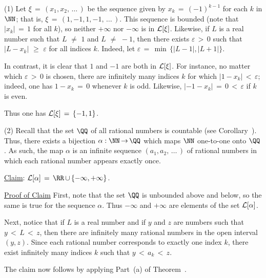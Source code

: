 {        \hspace*{\parindent}(1) Let ${\xi} \,=\, (x_{1},x_{2},\,{\ldots}\,)$ be the sequence given by $x_{k} \,=\, (-1)^{k-1}$ for each $k$ in ${\NN}$;
    that is, ${\xi} \,=\, (1,-1,1,-1,\,{\ldots}\,)$.
    This sequence is bounded (note that $|x_{k}| \,=\, 1$ for all $k$), so neither $+{\infty}$ nor $-{\infty}$ is in ${\cal L}[{\xi}]$.
    Likewise, if $L$ is a real number such that $L \,\,{\neq}\,\, 1$ and $L \,\,{\neq}\,\, -1$,
    then there exists ${\varepsilon}\,>\,0$ such that $|L-x_{k}|\,\,{\geq}\,\,{\varepsilon}$ for all indices $k$.
    Indeed, let ${\varepsilon} \,=\, \min\,\{|L-1|,|L+1|\}$.

        In contrast, it is clear that $1$ and $-1$ are both in ${\cal L}[{\xi}]$.
    For instance, no matter which ${\varepsilon}\,>\,0$ is chosen, there are infinitely many indices $k$ for which $|1-x_{k}|\,<\,{\varepsilon}$;
    indeed, one has $1-x_{k} \,=\, 0$ whenever $k$ is odd.
    Likewise, $|-1-x_{k}| \,=\, 0\,<\,{\varepsilon}$ if $k$ is even.

        Thus one has ${\cal L}[{\xi}] \,=\, \{-1,1\}$.

\V

        (2) Recall that the set ${\QQ}$ of all rational numbers is countable (see Corollary~).
    Thus, there exists a bijection ${\alpha}:{\NN} \,{\rightarrow}\, {\QQ}$ which maps ${\NN}$ one-to-one onto ${\QQ}$.
    As such, the map ${\alpha}$ is an infinite sequence $(a_{1},a_{2},\,{\ldots}\,)$ of rational numbers in which each rational number appears exactly once.

        \underline{Claim}: ${\cal L}[{\alpha}] \,=\, {\RR}\,{\cup}\,\{-{\infty},+{\infty}\}$.

        \underline{Proof of Claim} First, note that the set ${\QQ}$ is unbounded above and below, so the same is true for the sequence ${\alpha}$.
    Thus $-{\infty}$ and $+{\infty}$ are elements of the set ${\cal L}[{\alpha}]$.

        Next, notice that if $L$ is a real number and if $y$ and $z$ are numbers such that $y\,<\,L\,<\,z$,
    then there are infinitely many rational numbers in the open interval $(y,z)$.
    Since each rational number corresponds to exactly one index $k$, there exist infinitely many indices $k$ such that $y\,<\,a_{k}\,<\,z$.

        The claim now follows by applying Part~(a) of Theorem~.

\V
\V

}
